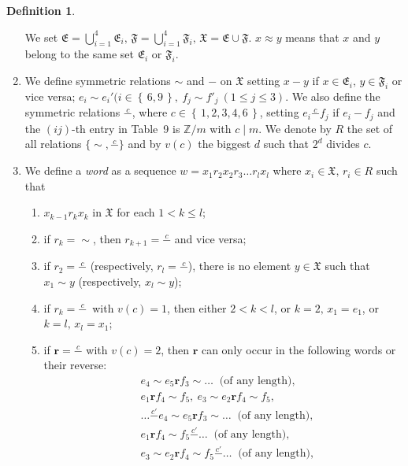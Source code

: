 \documentclass[12pt,a4paper]{amsart}
\theoremstyle{definition}
\newtheorem{defin}[theorem]{Definition}
\theoremstyle{remark}
\numberwithin{equation}{section}
\begin{document}
\begin{defin}
\begin{enumerate}
    We set
      ${\mathfrak E}={\bigcup}_{i=1}^4{\mathfrak E}_i,\,{\mathfrak F}={\bigcup}_{i=1}^4{\mathfrak F}_i,\,{\mathfrak X}={\mathfrak E}\cup{\mathfrak F}$. 
      $x\approx y$ means that $x$ and $y$ belong to the same set
      ${\mathfrak E}_i$ or ${\mathfrak F}_i$.
    \item  We define symmetric relations $\sim$ and $-$ on ${\mathfrak X}$
    setting $x-y$ if $x\in{\mathfrak E}_i,\,y\in{\mathfrak F}_i$ or vice versa; $e_i\sim
    e_i' (i\in{\left\{\,{6,9}\,\right\}},\ f_j\sim f'_j\ (1\le j\le 3)$. We also define
    the symmetric relations ${\stackrel{{c}}{-}}$, where $c\in{\left\{\,{1,2,3,4,6}\,\right\}}$, setting
    $e_i{\stackrel{{c}}{-}}f_j$ if $e_i-f_j$ and the $(ij)$-th entry in Table~9 is
    ${\mathbb Z}/m$ with $c\mid m$. We denote by $R$ the set of all relations
    $\{\sim,{\stackrel{{c}}{-}}\}$ and by $v(c)$ the biggest $d$ such that
    $2^d$ divides $c$. 
    \item  We define a \emph{word} as a sequence
	 $ w=   x_1 r_2 x_2 r_3 \dots r_l x_l$
    where $x_i\in{\mathfrak X},\,r_i\in R$ such that
    \begin{enumerate}
      \item $x_{k-1} r_k x_k$ in ${\mathfrak X}$ for each $1<k\le l$;
      \item if $r_k=\sim$, then $r_{k+1}={\stackrel{{c}}{-}}$ and vice versa;
      \item if $r_2={\stackrel{{c}}{-}}$ (respectively, $r_l={\stackrel{{c}}{-}}$), there is
      no element $y\in{\mathfrak X}$ such that $x_1\sim y$ (respectively,
      $x_l\sim y$);
      \item if $r_k={\stackrel{{c}}{-}}\,$ with $v(c)=1$, then either $2<k<l$, or
      $k=2,\,x_1=e_1$, or $k=l,\,x_l=x_1$;
      \item if ${\mathbf r}={\stackrel{{c}}{-}}$ with $v(c)=2$, then ${\mathbf r}$ can only occur in
      the following words or their reverse:
      \begin{align*}
	& e_4\sim e_5 {\mathbf r} f_3 \sim\dots\ \text{ (of any length)},\\
	& e_1{\mathbf r} f_4\sim f_5,\ e_3\sim e_2{\mathbf r} f_4\sim f_5,\\
	& \dots{\stackrel{{c'}}{-}}e_4\sim e_5 {\mathbf r} f_3 \sim\dots\ \text{ (of any
	length)},\\ 
	& e_1{\mathbf r} f_4\sim f_5{\stackrel{{c'}}{-}}\dots\ \text{ (of any length)},\\
	& e_3\sim e_2{\mathbf r} f_4\sim f_5{\stackrel{{c'}}{-}}\dots\ \text{ (of any length)},\\

\end{align*}
\end{enumerate}
\end{enumerate}
\end{defin}
\end{document}
